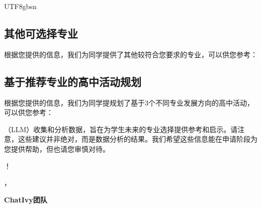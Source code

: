 \documentclass[12pt]{article}
\begin{document}
\begin{CJK*}{UTF8}{gbsn}


   
      
   \newpage
 
   \subsection*{其他可选择专业}
   根据您提供的信息，我们为同学提供了其他较符合您要求的专业，可以供您参考：
   

   \subsection*{基于推荐专业的高中活动规划}
   根据您提供的信息，我们为同学提规划了基于3个不同专业发展方向的高中活动，可以供您参考：

   \bigskip
   \bigskip
   \bigskip
   （LLM）收集和分析数据，旨在为学生未来的专业选择提供参考和启示。请注意，这些建议并非绝对，而是数据分析的结果。我们希望这些信息能在申请阶段为您提供帮助，但也请您审慎对待。

   \bigskip 
   ！

   ，

   \noindent\textbf{ChatIvy团队}

\printbibliography
\clearpage\end{CJK*}
\end{document}
